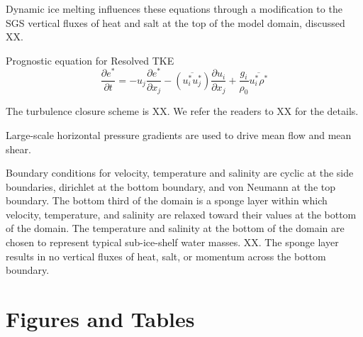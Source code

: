 \documentclass[draft]{styles/agujournal2019}
\begin{document}
	Dynamic ice melting influences these equations through a modification to the SGS vertical fluxes of heat and salt at the top of the model domain, discussed XX.
	
	
	
	
    Prognostic equation for Resolved TKE
	\begin{equation} \label{eq:eprog}
	\frac{\partial e^*}{\partial t} = 
	-u_j \frac{\partial e^*}{\partial x_j} 
	- (\overline{u^*_i u^*_j})\frac{\partial u_i}{\partial x_j} + \frac{g_i}{\rho_0}\overline{u^*_i \rho^*}
	\end{equation}
	
	The turbulence closure scheme is XX. We refer the readers to XX for the details. 
	
	Large-scale horizontal pressure gradients are used to drive mean flow and mean shear.
	
	Boundary conditions for velocity, temperature and salinity are cyclic at the side boundaries, dirichlet at the bottom boundary, and von Neumann at the top boundary. 
	The bottom third of the domain is a sponge layer within which velocity, temperature, and salinity are relaxed toward their values at the bottom of the domain. The temperature and salinity at the bottom of the domain are chosen to represent typical sub-ice-shelf water masses. XX. The sponge layer results in no vertical fluxes of heat, salt, or momentum across the bottom boundary. 

\section{Figures and Tables}
\end{document}
